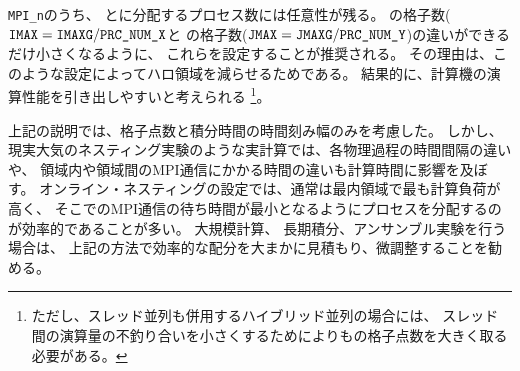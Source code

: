 \verb|MPI_n|のうち、{\XDIR} と{\YDIR}に分配するプロセス数には任意性が残る。
\XDIR の格子数($\nmitemeq{IMAX}=\nmitemeq{IMAXG}/\nmitemeq{PRC_NUM_X}$と
\YDIR の格子数($\nmitemeq{JMAX}=\nmitemeq{JMAXG}/\nmitemeq{PRC_NUM_Y}$)の違いができるだけ小さくなるように、
これらを設定することが推奨される。
その理由は、このような設定によってハロ領域を減らせるためである。
結果的に、計算機の演算性能を引き出しやすいと考えられる
\footnote{ただし、スレッド並列も併用するハイブリッド並列の場合には、
スレッド間の演算量の不釣り合いを小さくするために{\XDIR}よりも{\YDIR}の格子点数を大きく取る必要がある。}。


上記の説明では、格子点数と積分時間の時間刻み幅のみを考慮した。
しかし、現実大気のネスティング実験のような実計算では、各物理過程の時間間隔の違いや、
領域内や領域間のMPI通信にかかる時間の違いも計算時間に影響を及ぼす。
オンライン・ネスティングの設定では、通常は最内領域で最も計算負荷が高く、
そこでのMPI通信の待ち時間が最小となるようにプロセスを分配するのが効率的であることが多い。
大規模計算、 長期積分、アンサンブル実験を行う場合は、
上記の方法で効率的な配分を大まかに見積もり、微調整することを勧める。

